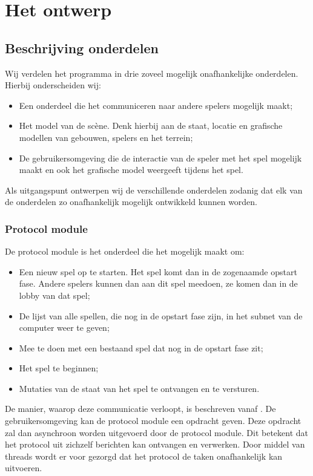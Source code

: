 \section{Het ontwerp}
    \subsection{Beschrijving onderdelen}
    Wij verdelen het programma in drie zoveel mogelijk onafhankelijke onderdelen. Hierbij onderscheiden wij:
    \begin{itemize}
    \item Een onderdeel die het communiceren naar andere spelers mogelijk maakt;
	\item Het model van de sc\`ene. Denk hierbij aan de staat, locatie en grafische modellen van gebouwen, spelers en het terrein;
	\item De gebruikersomgeving die de interactie van de speler met het spel mogelijk maakt en ook het grafische model weergeeft tijdens het spel.
    \end{itemize}

    Als uitgangspunt ontwerpen wij de verschillende onderdelen zodanig dat elk van de onderdelen zo onafhankelijk mogelijk ontwikkeld kunnen worden.
    	
    \subsubsection{Protocol module}
    De protocol module is het onderdeel die het mogelijk maakt om:
	\begin{itemize}
    \item Een nieuw spel op te starten. Het spel komt dan in de zogenaamde opstart fase. Andere spelers kunnen dan aan dit spel meedoen, ze komen dan in de lobby van dat spel;
	\item De lijst van alle spellen, die nog in de opstart fase zijn, in het subnet van de computer weer te geven;
	\item Mee te doen met een bestaand spel dat nog in de opstart fase zit;
	\item Het spel te beginnen;
	\item Mutaties van de staat van het spel te ontvangen en te versturen.
	\end{itemize}
    De manier, waarop deze communicatie verloopt, is beschreven vanaf \protoref. De gebruikersomgeving kan de protocol module een opdracht geven. Deze    opdracht zal dan asynchroon worden uitgevoerd door de protocol module. Dit betekent dat het protocol uit zichzelf berichten kan ontvangen en verwerken. Door middel van threads wordt er voor gezorgd dat het protocol de taken onafhankelijk kan uitvoeren.
	
